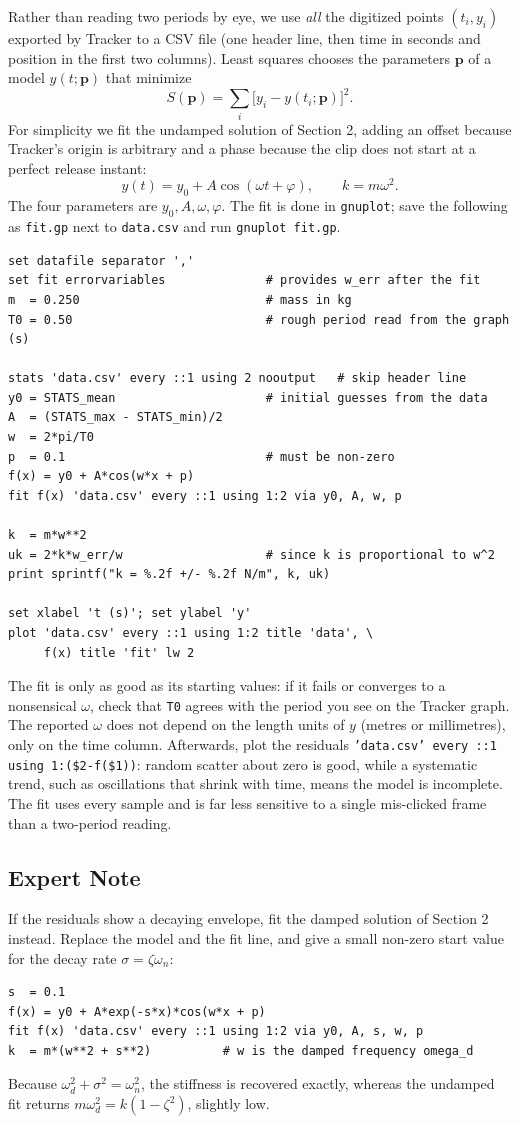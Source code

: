 \documentclass[12pt,a4paper]{article}
\begin{document}
Rather than reading two periods by eye, we use \emph{all} the digitized points $(t_i, y_i)$ exported by Tracker to a CSV file (one header line, then time in seconds and position in the first two columns). Least squares chooses the parameters $\mathbf p$ of a model $y(t;\mathbf p)$ that minimize
\[
S(\mathbf p)=\sum_i\bigl[y_i-y(t_i;\mathbf p)\bigr]^2 .
\]
For simplicity we fit the undamped solution of Section 2, adding an offset because Tracker's origin is arbitrary and a phase because the clip does not start at a perfect release instant:
\[
y(t)=y_0+A\cos(\omega t+\varphi), \qquad k=m\omega^2 .
\]
The four parameters are $y_0, A, \omega, \varphi$. The fit is done in \texttt{gnuplot}; save the following as \texttt{fit.gp} next to \texttt{data.csv} and run \texttt{gnuplot fit.gp}.
{\footnotesize
\begin{verbatim}
set datafile separator ','
set fit errorvariables              # provides w_err after the fit
m  = 0.250                          # mass in kg
T0 = 0.50                           # rough period read from the graph (s)

stats 'data.csv' every ::1 using 2 nooutput   # skip header line
y0 = STATS_mean                     # initial guesses from the data
A  = (STATS_max - STATS_min)/2
w  = 2*pi/T0
p  = 0.1                            # must be non-zero
f(x) = y0 + A*cos(w*x + p)
fit f(x) 'data.csv' every ::1 using 1:2 via y0, A, w, p

k  = m*w**2
uk = 2*k*w_err/w                    # since k is proportional to w^2
print sprintf("k = %.2f +/- %.2f N/m", k, uk)

set xlabel 't (s)'; set ylabel 'y'
plot 'data.csv' every ::1 using 1:2 title 'data', \
     f(x) title 'fit' lw 2
\end{verbatim}
}
The fit is only as good as its starting values: if it fails or converges to a nonsensical $\omega$, check that \texttt{T0} agrees with the period you see on the Tracker graph. The reported $\omega$ does not depend on the length units of $y$ (metres or millimetres), only on the time column. Afterwards, plot the residuals \texttt{'data.csv' every ::1 using 1:(\$2-f(\$1))}: random scatter about zero is good, while a systematic trend, such as oscillations that shrink with time, means the model is incomplete. The fit uses every sample and is far less sensitive to a single mis-clicked frame than a two-period reading.

\subsection*{Expert Note}

If the residuals show a decaying envelope, fit the damped solution of Section 2 instead. Replace the model and the fit line, and give a small non-zero start value for the decay rate $\sigma=\zeta\omega_n$:
{\footnotesize
\begin{verbatim}
s  = 0.1
f(x) = y0 + A*exp(-s*x)*cos(w*x + p)
fit f(x) 'data.csv' every ::1 using 1:2 via y0, A, s, w, p
k  = m*(w**2 + s**2)          # w is the damped frequency omega_d
\end{verbatim}
}
Because $\omega_d^2+\sigma^2=\omega_n^2$, the stiffness is recovered exactly, whereas the undamped fit returns $m\omega_d^2=k(1-\zeta^2)$, slightly low.
\end{document}
